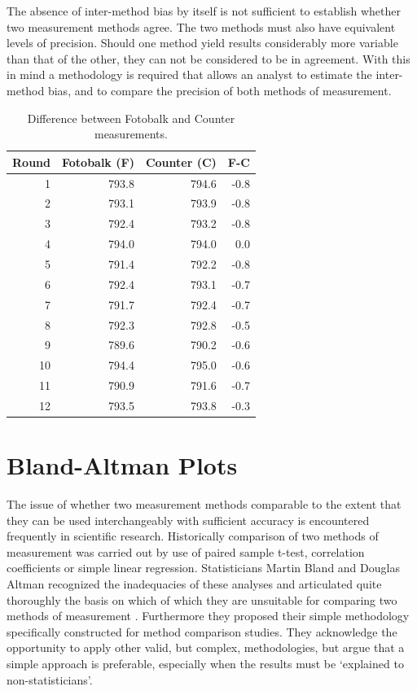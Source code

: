 \documentclass[12pt, a4paper]{report}
\begin{document}
The absence of inter-method bias by itself is not sufficient to
establish whether two measurement methods agree. The two
methods must also have equivalent levels of precision. Should one
method yield results considerably more variable than that of the
other, they can not be considered to be in agreement. With this in
mind a methodology is required that allows an analyst to estimate
the inter-method bias, and to compare the precision of both
methods of measurement.
\newpage
\begin{table}[h!]

\begin{center}

\begin{tabular}{rrrr}
  \hline
 Round& Fotobalk (F) & Counter (C) & F-C \\
  \hline
1 & 793.8& 794.6 & -0.8 \\
  2 & 793.1 & 793.9 & -0.8 \\
  3 & 792.4 & 793.2 & -0.8 \\
  4 & 794.0 & 794.0 & 0.0 \\
  5 & 791.4 & 792.2 & -0.8 \\
  6 & 792.4 & 793.1 & -0.7 \\
  7 & 791.7 & 792.4 & -0.7 \\
  8 & 792.3 & 792.8 & -0.5 \\
  9 & 789.6 & 790.2 & -0.6 \\
  10 & 794.4 & 795.0 & -0.6 \\
  11 & 790.9 & 791.6 & -0.7 \\
  12 & 793.5 & 793.8 & -0.3 \\
   \hline
\end{tabular}
\caption{Difference between Fotobalk and Counter measurements.}
\end{center}
\end{table}

\bigskip


\section{Bland-Altman Plots}
The issue of whether two measurement methods comparable to the
extent that they can be used interchangeably with sufficient
accuracy is encountered frequently in scientific research.
Historically comparison of two methods of measurement was carried
out by use of paired sample t-test, correlation coefficients or
simple linear regression. Statisticians Martin Bland and Douglas
Altman recognized the inadequacies of these analyses and
articulated quite thoroughly the basis on which of which they are
unsuitable for comparing two methods of measurement \citep*{BA83}.
Furthermore they proposed their simple methodology specifically
constructed for method comparison studies. They acknowledge the
opportunity to apply other valid, but complex, methodologies, but
argue that a simple approach is preferable, especially when the
results must be `explained to non-statisticians'.
\end{document}
